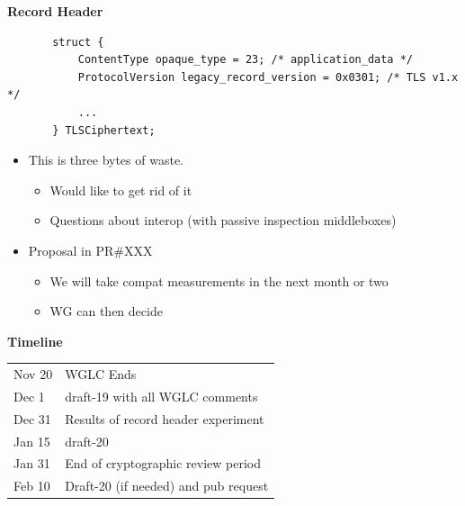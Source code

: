 \documentclass[helvetica]{seminar}
\newcommand{\heading}[1]{%
  \begin{center} 
    \large\bf 
    #1 
  \end{center} 
  \vspace{.4 in}}
\begin{document}
\begin{slide}
\heading{Record Header}

{\scriptsize
\begin{verbatim}
       struct {
           ContentType opaque_type = 23; /* application_data */
           ProtocolVersion legacy_record_version = 0x0301; /* TLS v1.x */
           ...
       } TLSCiphertext;
\end{verbatim}

\begin{itemize}
\item This is three bytes of waste.
  \begin{itemize}
  \item Would like to get rid of it
  \item Questions about interop (with passive inspection middleboxes)
  \end{itemize}
\item Proposal in PR\#XXX
  \begin{itemize}
  \item We will take compat measurements in the next month or two
  \item WG can then decide
  \end{itemize}
\end{itemize}
}
\end{slide}


\begin{slide}
\heading{Timeline}

\begin{tabular}{l l}
Nov 20 & WGLC Ends \\
Dec 1 & draft-19 with all WGLC comments \\
Dec 31 & Results of record header experiment \\
Jan 15 & draft-20 \\
Jan 31 & End of cryptographic review period \\
Feb 10 & Draft-20 (if needed) and pub request \\
\end{tabular}

\end{slide}
\end{document}
